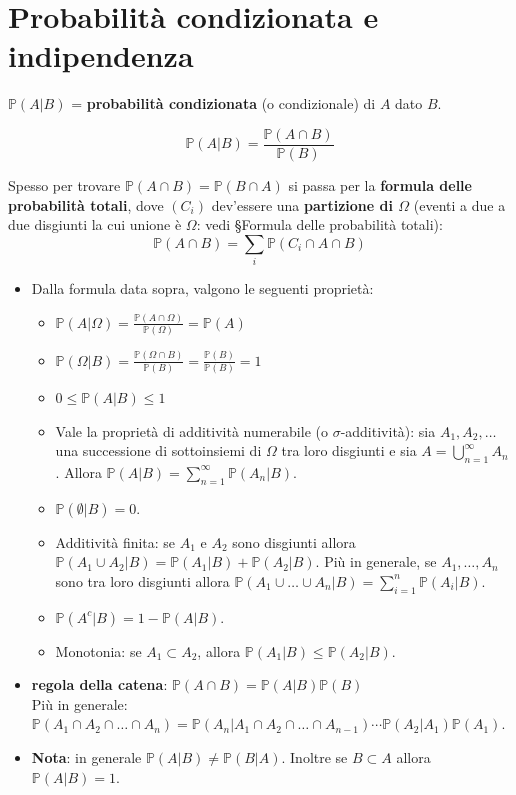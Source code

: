 \documentclass[12pt]{extarticle} %
\begin{document}
\newpage

\section{Probabilità condizionata e indipendenza}
$\mathbb{P}(A|B)$ = \textbf{probabilità condizionata} (o condizionale) di $A$ dato $B$.

$$ \boxed{\mathbb{P}(A|B) = \frac{\mathbb{P}(A \cap B)}{\mathbb{P}(B)}} $$

\noindent Spesso per trovare $\mathbb{P}(A\cap B) = \mathbb{P}(B\cap A)$ si passa per la \textbf{formula delle probabilità totali}, dove $(C_i)$ dev'essere una \textbf{partizione di $\Omega$} (eventi a due a due disgiunti la cui unione è $\Omega$: vedi §Formula delle probabilità totali):
\[
\mathbb{P}(A\cap B) = \sum_i \mathbb{P}(C_i \cap A \cap B)
\]

\begin{itemize}
    \item Dalla formula data sopra, valgono le seguenti proprietà:
    \begin{itemize}
        \item $\mathbb{P}(A|\Omega) = \frac{\mathbb{P}(A \cap \Omega)}{\mathbb{P}(\Omega)} = \mathbb{P}(A)$ 
        \item $\mathbb{P}(\Omega|B) = \frac{\mathbb{P}(\Omega \cap B)}{\mathbb{P}(B)} = \frac{\mathbb{P}(B)}{\mathbb{P}(B)} = 1$
        \item $0 \le \mathbb{P}(A|B) \le 1$
        \item Vale la proprietà di additività numerabile (o $\sigma$-additività): sia $A_1, A_2, \dots$ una successione di sottoinsiemi di $\Omega$ tra loro disgiunti e sia $A = \bigcup_{n=1}^{\infty} A_n$. Allora $\mathbb{P}(A|B) = \sum_{n=1}^{\infty} \mathbb{P}(A_n|B)$.
        \item $\mathbb{P}(\emptyset|B) = 0$.
        \item Additività finita: se $A_1$ e $A_2$ sono disgiunti allora $\mathbb{P}(A_1 \cup A_2 | B) = \mathbb{P}(A_1|B) + \mathbb{P}(A_2|B)$. Più in generale, se $A_1, \dots, A_n$ sono tra loro disgiunti allora $\mathbb{P}(A_1 \cup \dots \cup A_n | B) = \sum_{i=1}^{n} \mathbb{P}(A_i|B)$.
        \item $\mathbb{P}(A^c|B) = 1 - \mathbb{P}(A|B)$.
        \item Monotonia: se $A_1 \subset A_2$, allora $\mathbb{P}(A_1|B) \le \mathbb{P}(A_2|B)$.
    \end{itemize}

    \vspace{0.3cm}
    \item \textbf{regola della catena}: $ \mathbb{P}(A \cap B) = \mathbb{P}(A|B)\mathbb{P}(B) $ \\ Più in generale: $ \mathbb{P}(A_1 \cap A_2 \cap \dots \cap A_n) = \mathbb{P}(A_n|A_1 \cap A_2 \cap \dots \cap A_{n-1}) \cdots \mathbb{P}(A_2|A_1)\mathbb{P}(A_1).$

    \item \textbf{Nota}: in generale $\mathbb{P}(A|B) \ne \mathbb{P}(B|A)$. Inoltre se $B \subset A$ allora $\mathbb{P}(A|B) = 1$.
\end{itemize}
\end{document}
